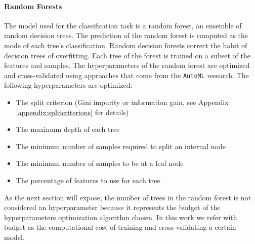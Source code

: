 \documentclass[11pt, a4paper]{article}
\begin{document}
  \paragraph{Random Forests}
    The model used for the classification task is a random forest, an ensemble of random decision trees. The prediction of the random forest is computed as the mode of each tree's classification. Random decision forests correct the habit of decision trees of overfitting. Each tree of the forest is trained on a subset of the features and samples. The hyperparameters of the random forest are optimized and cross-validated using approaches that come from the \texttt{AutoML} research. The following hyperparameters are optimized:
    \begin{itemize}
      \item The split criterion (Gini impurity or information gain, see Appendix \ref{appendix:splitcriterions} for details)
      \item The maximum depth of each tree
      \item The minimum number of samples required to split an internal node
      \item The minimum number of samples to be at a leaf node
      \item The percentage of features to use for each tree
    \end{itemize}
  As the next section will expose, the number of trees in the random forest is not considered an hyperparameter because it represents the budget of the hyperparameters optimization algorithm chosen. In this work we refer with budget as the computational cost of training and cross-validating a certain model.
\end{document}
